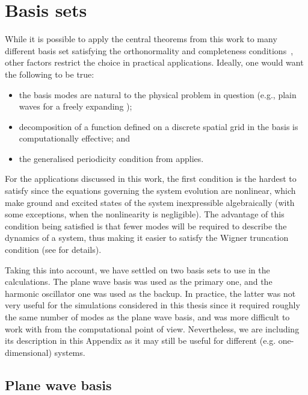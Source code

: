 \chapter{Basis sets}
\label{cha:appendix:bases}

While it is possible to apply the central theorems from this work to many different basis set satisfying the orthonormality and completeness conditions~, other factors restrict the choice in practical applications.
Ideally, one would want the following to be true:
\begin{itemize}
    \item the basis modes are natural to the physical problem in question (e.g., plain waves for a freely expanding );
    \item decomposition of a function defined on a discrete spatial grid in the basis is computationally effective; and
    \item the generalised periodicity condition from  applies.
\end{itemize}

For the applications discussed in this work, the first condition is the hardest to satisfy since the equations governing the system evolution are nonlinear, which make ground and excited states of the system inexpressible algebraically (with some exceptions, when the nonlinearity is negligible).
The advantage of this condition being satisfied is that fewer modes will be required to describe the dynamics of a system, thus making it easier to satisfy the Wigner truncation condition (see  for details).

Taking this into account, we have settled on two basis sets to use in the calculations.
The plane wave basis was used as the primary one, and the harmonic oscillator one was used as the backup.
In practice, the latter was not very useful for the simulations considered in this thesis since it required roughly the same number of modes as the plane wave basis, and was more difficult to work with from the computational point of view.
Nevertheless, we are including its description in this Appendix as it may still be useful for different (e.g. one-dimensional) systems.


\section{Plane wave basis}

